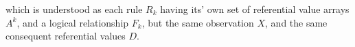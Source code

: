 which is understood as each rule $R_k$ having its' own set of referential value arrays $A^k$, and a logical relationship $F_k$, but the same observation $X$, and
the same consequent referential values $D$.




